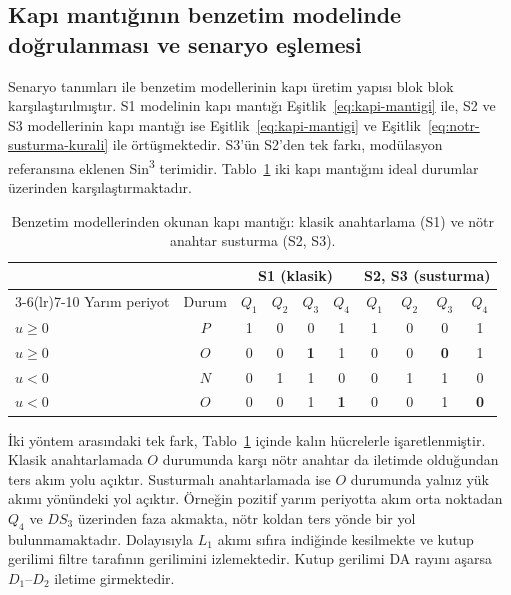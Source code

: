\subsection{Kapı mantığının benzetim modelinde doğrulanması ve senaryo eşlemesi}
\label{sec:model-kapi-mantigi}

Senaryo tanımları ile benzetim modellerinin kapı üretim yapısı blok blok karşılaştırılmıştır. S1 modelinin kapı mantığı Eşitlik~\eqref{eq:kapi-mantigi} ile, S2 ve S3 modellerinin kapı mantığı ise Eşitlik~\eqref{eq:kapi-mantigi} ve Eşitlik~\eqref{eq:notr-susturma-kurali} ile örtüşmektedir. S3'ün S2'den tek farkı, modülasyon referansına eklenen Sin\textsuperscript{3} terimidir. Tablo~\ref{tab:model-kapi-mantigi} iki kapı mantığını ideal durumlar üzerinden karşılaştırmaktadır.

\begin{table}[H]
  \centering
  \caption{Benzetim modellerinden okunan kapı mantığı: klasik anahtarlama (S1) ve nötr anahtar susturma (S2, S3).}
  \label{tab:model-kapi-mantigi}
  \small
  \begin{tabular}{l c c c c c c c c c}
    \toprule
    & & \multicolumn{4}{c}{S1 (klasik)} & \multicolumn{4}{c}{S2, S3 (susturma)} \\
    \cmidrule(lr){3-6}\cmidrule(lr){7-10}
    Yarım periyot & Durum & $Q_1$ & $Q_2$ & $Q_3$ & $Q_4$ & $Q_1$ & $Q_2$ & $Q_3$ & $Q_4$ \\
    \midrule
    $u\geq0$ & $P$ & 1 & 0 & 0 & 1 & 1 & 0 & 0 & 1 \\
    $u\geq0$ & $O$ & 0 & 0 & \textbf{1} & 1 & 0 & 0 & \textbf{0} & 1 \\
    $u<0$ & $N$ & 0 & 1 & 1 & 0 & 0 & 1 & 1 & 0 \\
    $u<0$ & $O$ & 0 & 0 & 1 & \textbf{1} & 0 & 0 & 1 & \textbf{0} \\
    \bottomrule
  \end{tabular}
\end{table}

İki yöntem arasındaki tek fark, Tablo~\ref{tab:model-kapi-mantigi} içinde kalın hücrelerle işaretlenmiştir. Klasik anahtarlamada $O$ durumunda karşı nötr anahtar da iletimde olduğundan ters akım yolu açıktır. Susturmalı anahtarlamada ise $O$ durumunda yalnız yük akımı yönündeki yol açıktır. Örneğin pozitif yarım periyotta akım orta noktadan $Q_4$ ve $DS_3$ üzerinden faza akmakta, nötr koldan ters yönde bir yol bulunmamaktadır. Dolayısıyla $L_1$ akımı sıfıra indiğinde kesilmekte ve kutup gerilimi filtre tarafının gerilimini izlemektedir. Kutup gerilimi DA rayını aşarsa $D_1$--$D_2$ iletime girmektedir.

